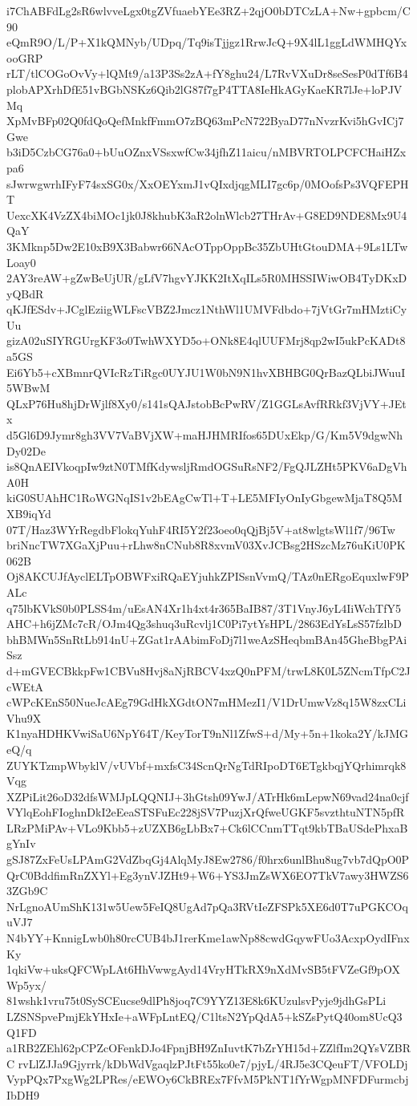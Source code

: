 i7ChABFdLg2sR6wlvveLgx0tgZVfuaebYEe3RZ+2qjO0bDTCzLA+Nw+gpbcm/C90
eQmR9O/L/P+X1kQMNyb/UDpq/Tq9isTjjgz1RrwJcQ+9X4lL1ggLdWMHQYxooGRP
rLT/tlCOGoOvVy+lQMt9/a13P3Ss2zA+fY8ghu24/L7RvVXuDr8seSesP0dTf6B4
plobAPXrhDfE51vBGbNSKz6Qib2lG87f7gP4TTA8IeHkAGyKaeKR7lJe+loPJVMq
XpMvBFp02Q0fdQoQefMnkfFmmO7zBQ63mPcN722ByaD77nNvzrKvi5hGvICj7Gwe
b3iD5CzbCG76a0+bUuOZnxVSsxwfCw34jfhZ11aicu/nMBVRTOLPCFCHaiHZxpa6
sJwrwgwrhIFyF74sxSG0x/XxOEYxmJ1vQIxdjqgMLI7gc6p/0MOofsPs3VQFEPHT
UexcXK4VzZX4biMOc1jk0J8khubK3aR2olnWlcb27THrAv+G8ED9NDE8Mx9U4QaY
3KMknp5Dw2E10xB9X3Babwr66NAcOTppOppBc35ZbUHtGtouDMA+9Ls1LTwLoay0
2AY3reAW+gZwBeUjUR/gLfV7hgvYJKK2ItXqILs5R0MHSSIWiwOB4TyDKxDyQBdR
qKJfESdv+JCglEziigWLFscVBZ2Jmcz1NthWl1UMVFdbdo+7jVtGr7mHMztiCyUu
gizA02uSIYRGUrgKF3o0TwhWXYD5o+ONk8E4qlUUFMrj8qp2wI5ukPcKADt8a5GS
Ei6Yb5+cXBmnrQVIcRzTiRgc0UYJU1W0bN9N1hvXBHBG0QrBazQLbiJWuuI5WBwM
QLxP76Hu8hjDrWjlf8Xy0/s141sQAJstobBcPwRV/Z1GGLsAvfRRkf3VjVY+JEtx
d5Gl6D9Jymr8gh3VV7VaBVjXW+maHJHMRIfos65DUxEkp/G/Km5V9dgwNhDy02De
is8QnAEIVkoqpIw9ztN0TMfKdywsljRmdOGSuRsNF2/FgQJLZHt5PKV6aDgVhA0H
kiG0SUAhHC1RoWGNqIS1v2bEAgCwTl+T+LE5MFIyOnIyGbgewMjaT8Q5MXB9iqYd
07T/Haz3WYrRegdbFlokqYuhF4RI5Y2f23oeo0qQjBj5V+at8wlgtsWl1f7/96Tw
briNncTW7XGaXjPuu+rLhw8nCNub8R8xvmV03XvJCBsg2HSzcMz76uKiU0PK062B
Oj8AKCUJfAyclELTpOBWFxiRQaEYjuhkZPISsnVvmQ/TAz0nERgoEquxlwF9PALc
q75lbKVkS0b0PLSS4m/uEsAN4Xr1h4xt4r365BaIB87/3T1VnyJ6yL4IiWchTfY5
AHC+h6jZMc7cR/OJm4Qg3shuq3uRcvlj1C0Pi7ytYsHPL/2863EdYsLsS57fzlbD
bhBMWn5SnRtLb914nU+ZGat1rAAbimFoDj7l1weAzSHeqbmBAn45GheBbgPAiSsz
d+mGVECBkkpFw1CBVu8Hvj8aNjRBCV4xzQ0nPFM/trwL8K0L5ZNcmTfpC2JcWEtA
cWPcKEnS50NueJcAEg79GdHkXGdtON7mHMezI1/V1DrUmwVz8q15W8zxCLiVhu9X
K1nyaHDHKVwiSaU6NpY64T/KeyTorT9nNl1ZfwS+d/My+5n+1koka2Y/kJMGeQ/q
ZUYKTzmpWbyklV/vUVbf+mxfsC34ScnQrNgTdRIpoDT6ETgkbqjYQrhimrqk8Vqg
XZPiLit26oD32dfsWMJpLQQNIJ+3hGtsh09YwJ/ATrHk6mLepwN69vad24na0cjf
VYlqEohFIoghnDkI2eEeaSTSFuEc228jSV7PuzjXrQfweUGKF5svzthtuNTN5pfR
LRzPMiPAv+VLo9Kbb5+zUZXB6gLbBx7+Ck6lCCnmTTqt9kbTBaUSdePhxaBgYnIv
gSJ87ZxFeUsLPAmG2VdZbqGj4AlqMyJ8Ew2786/f0hrx6unlBhu8ug7vb7dQpO0P
QrC0BddfimRnZXYl+Eg3ynVJZHt9+W6+YS3JmZsWX6EO7TkV7awy3HWZS63ZGb9C
NrLgnoAUmShK131w5Uew5FeIQ8UgAd7pQa3RVtIeZFSPk5XE6d0T7uPGKCOquVJ7
N4bYY+KnnigLwb0h80rcCUB4bJ1rerKme1awNp88cwdGqywFUo3AcxpOydIFnxKy
1qkiVw+uksQFCWpLAt6HhVwwgAyd14VryHTkRX9nXdMvSB5tFVZeGf9pOXWp5yx/
81wshk1vru75t0SySCEucse9dlPh8joq7C9YYZ13E8k6KUzulsvPyje9jdhGsPLi
LZSNSpvePmjEkYHxIe+aWFpLntEQ/C1ltsN2YpQdA5+kSZsPytQ40om8UcQ3Q1FD
a1RB2ZEhl62pCPZcOFenkDJo4FpnjBH9ZnIuvtK7bZrYH15d+ZZlfIm2QYsVZBRC
rvLlZJJa9Gjyrrk/kDbWdVgaqlzPJtFt55ko0e7/pjyL/4RJ5e3CQeuFT/VFOLDj
VypPQx7PxgWg2LPRes/eEWOy6CkBREx7FfvM5PkNT1fYrWgpMNFDFurmcbjIbDH9
